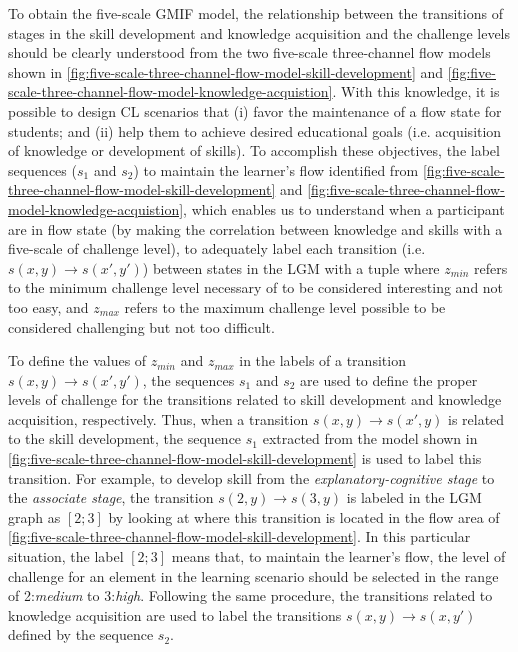 To obtain the five-scale GMIF model, the relationship between the transitions of stages in the skill development and knowledge acquisition and the challenge levels should be clearly understood from the two five-scale three-channel flow models shown in \autoref{fig:five-scale-three-channel-flow-model-skill-development} and \autoref{fig:five-scale-three-channel-flow-model-knowledge-acquistion}. With this knowledge, it is possible to design CL scenarios that (i) favor the maintenance of a flow state for students; and (ii) help them to achieve desired educational goals (i.e. acquisition of knowledge or development of skills). To accomplish these objectives, the label sequences ($s_{1}$ and $s_{2}$) to maintain the learner's flow identified from \autoref{fig:five-scale-three-channel-flow-model-skill-development} and \autoref{fig:five-scale-three-channel-flow-model-knowledge-acquistion}, which enables us to understand when a participant are in flow state (by making the correlation between knowledge and skills with a five-scale of challenge level), to adequately label each transition (i.e. $s(x,y) \to s(x',y')$) between states in the LGM with a tuple  where $z_{min}$ refers to the minimum challenge level necessary of to be considered interesting and not too easy, and $z_{max}$ refers to the maximum challenge level possible to be considered challenging but not too difficult.

To define the values of $z_{min}$ and $z_{max}$ in the labels  of a transition $s(x,y) \to s(x',y')$, the sequences $s_{1}$ and $s_{2}$ are used to define the proper levels of challenge for the transitions related to skill development and knowledge acquisition, respectively. Thus, when a transition $s(x, y) \to s(x', y)$ is related to the skill development, the sequence $s_{1}$ extracted from the model shown in \autoref{fig:five-scale-three-channel-flow-model-skill-development} is used to label this transition. For example, to develop skill from the \emph{explanatory-cognitive stage} to the \emph{associate stage}, the transition $s(2,y) \to s(3,y)$ is labeled in the LGM graph as $[2;3]$ by looking at where this transition is located in the flow area of \autoref{fig:five-scale-three-channel-flow-model-skill-development}. In this particular situation, the label $[2;3]$ means that, to maintain the learner’s flow, the level of challenge for an element in the learning scenario should be selected in the range of 2:\emph{medium} to 3:\emph{high}. Following the same procedure, the transitions related to knowledge acquisition are used to label the transitions $s(x,y) \to s(x,y')$ defined by the sequence $s_{2}$.

